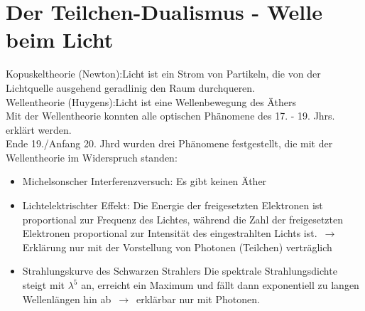 \section{Der Teilchen-Dualismus - Welle beim Licht}

Kopuskeltheorie (Newton):\quad Licht ist ein Strom von Partikeln, die von der Lichtquelle ausgehend geradlinig den Raum durchqueren.\\

Wellentheorie (Huygens):\quad Licht ist eine Wellenbewegung des Äthers\\

Mit der Wellentheorie konnten alle optischen Phänomene des 17. - 19. Jhrs. erklärt werden.\\


Ende 19./Anfang 20. Jhrd wurden drei Phänomene festgestellt, die mit der Wellentheorie im Widerspruch standen:
\begin{itemize}
    \item Michelsonscher Interferenzversuch: Es gibt keinen Äther
    \item Lichtelektrischter Effekt:
        \subitem Die Energie der freigesetzten Elektronen ist proportional zur Frequenz des Lichtes, während die Zahl der freigesetzten Elektronen proportional zur Intensität des eingestrahlten Lichts ist.
        \subitem $\,\to\,$ Erklärung nur mit der Vorstellung von Photonen (Teilchen) verträglich
    \item Strahlungskurve des Schwarzen Strahlers
        \subitem Die spektrale Strahlungsdichte steigt mit $\lambda^5$ an, erreicht ein Maximum und fällt dann exponentiell zu langen Wellenlängen hin ab $\,\to\,$ erklärbar nur mit Photonen.
\end{itemize}

